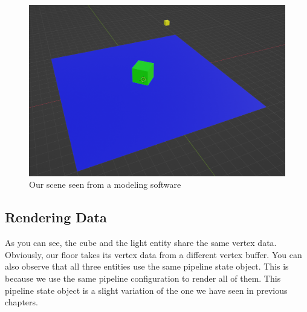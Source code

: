 \begin{minipage}{\linewidth}{\noindent}
    
\end{minipage}

\begin{minipage}{\linewidth}{\noindent}
    
\end{minipage}

\begin{figure}[ht]
    \centering
    \includegraphics[scale=0.30]{images/ChScene/SimpleSceneSeenSetup.png}
    \caption{Our scene seen from a modeling software}
    \label{fig::SimpleSceneSetup}
\end{figure}

\subsection{Rendering Data}

As you can see, the cube and the light entity share the same vertex data.
Obviously, our floor takes its vertex data from a different vertex buffer.
You can also observe that all three entities use the same pipeline state object.
This is because we use the same pipeline configuration to render all of them.
This pipeline state object is a slight variation of the one we have seen in
previous chapters.

\begin{minipage}{\linewidth}{\noindent}
    
\end{minipage}

